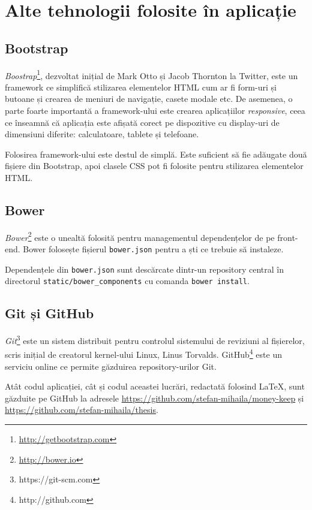 \chapter{Alte tehnologii folosite în aplicație}

\section{Bootstrap}

\emph{Boostrap}\footnote{\url{http://getbootstrap.com}}, 
dezvoltat inițial de Mark Otto 
și Jacob Thornton la Twitter, este un framework ce simplifică stilizarea
elementelor HTML cum ar fi form-uri și butoane și crearea
de meniuri de navigație, casete modale etc. De asemenea,
o parte foarte importantă a framework-ului este crearea aplicațiilor
\emph{responsive}, ceea ce înseamnă că aplicația este afișată
corect pe dispozitive cu display-uri de dimensiuni diferite:
calculatoare, tablete și telefoane.

Folosirea framework-ului este destul de simplă. Este
suficient să fie adăugate două fișiere din Bootstrap,
apoi clasele CSS pot fi folosite pentru stilizarea
elementelor HTML.


\section{Bower}

\emph{Bower}\footnote{\url{http://bower.io}} este o unealtă
folosită pentru managementul dependențelor de pe front-end.
Bower folosește fișierul \texttt{bower.json} pentru a 
ști ce trebuie să instaleze.



Dependențele din \texttt{bower.json} sunt descărcate dintr-un
repository central în directorul \texttt{static/bower\_components}
cu comanda \texttt{bower install}.

\section{Git și GitHub}

\emph{Git}\footnote{https://git-scm.com} este un sistem distribuit
pentru controlul sistemului de reviziuni al fișierelor,
scris inițial de creatorul kernel-ului Linux, Linus Torvalds.
GitHub\footnote{http://github.com} este un serviciu
online ce permite găzduirea repository-urilor Git.

Atât codul aplicației, cât și codul aceastei lucrări, redactată folosind \LaTeX{},
sunt găzduite pe GitHub la adresele \url{https://github.com/stefan-mihaila/money-keep}
și \url{https://github.com/stefan-mihaila/thesis}.

